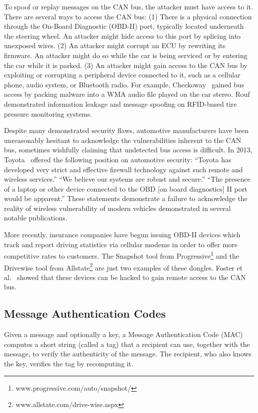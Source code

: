 To spoof or replay messages on the CAN bus, the attacker must have access to it.
There are several ways to access the CAN bus:  (1) There is a
physical connection through the On-Board Diagnostic (OBD-II) port, 
typically located underneath the steering wheel.  An attacker might hide
access to this port by splicing into unexposed wires.
(2) An attacker might corrupt an ECU by rewriting its firmware. An attacker might
do so while the car is being serviced or by entering the car while it is parked.
(3) An attacker might gain access to the CAN bus by exploiting or corrupting a peripheral
device connected to it, such as a cellular phone, audio system, or Bluetooth
radio.  For example, Checkoway~\cite{Checkoway-2011} gained bus access by packing 
malware into a WMA audio file played on the car stereo. 
Rouf~\cite{Rouf2010} demonstrated information leakage and message spoofing on RFID-based tire pressure monitoring systems.

Despite many demonstrated security flaws, automotive 
manufacturers have been unreasonably hesitant to acknowledge the vulnerabilities inherent to the CAN bus,
sometimes wishfully claiming that undetected bus access is difficult. 
In 2013, Toyota~\cite{bbc_toyota} offered the following position on automotive security: 
``Toyota has developed very strict and effective firewall technology against such remote and wireless services.'' 
``We believe our systems are robust and secure.'' 
``The presence of a laptop or other device connected to the OBD [on board diagnostics] II port would be apparent.'' 
These statements demonstrate a failure to acknowledge the 
reality of wireless vulnerability of modern vehicles demonstrated in several notable publications.

More recently, insurance companies have begun issuing OBD-II devices which track and report driving statistics via cellular modems in order to offer more competitive rates to customers. The Snapshot tool from Progressive\footnote{www.progressive.com/auto/snapshot/} and the Drivewise tool from Allstate\footnote{www.allstate.com/drive-wise.aspx} are just two examples of these dongles. Foster et al.~\cite{Foster15} showed that these devices can be hacked to gain remote access to the CAN bus.

\subsection{Message Authentication Codes}

Given a message and optionally a key, a Message Authentication Code (MAC) computes a short string (called a tag) 
that a recipient can use, together with the message, to verify the authenticity of the message.  
The recipient, who also knows the key, 
verifies the tag by recomputing it.

